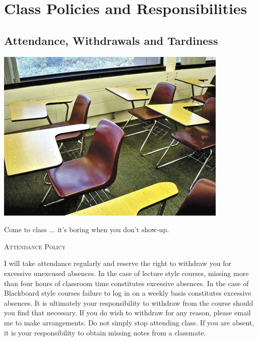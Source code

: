 \documentclass{tufte-handout}
\begin{document}
\section{Class Policies and Responsibilities}
\subsection {Attendance, Withdrawals and Tardiness}

\begin{marginfigure}%
  \includegraphics[width=\linewidth]{../assets/emptydesks.jpg}
  \caption{Come to class $\ldots$ it's boring when you don't show-up.}
  \label{fig:marginfig}
  \vspace{0.3in}
\end{marginfigure}

\begin{center}
\textsc{Attendance Policy}
\end{center}

I will take attendance regularly and reserve the right to withdraw you for excessive unexcused absences. In the case of lecture style courses, missing more than four hours of classroom time constitutes excessive absences. In the case of Blackboard style courses failure to log in on a weekly basis constitutes excessive absences. It is ultimately your responsibility to withdraw from the course should you find that necessary. If you do wish to withdraw for any reason, please email me to make arrangements. Do not simply stop attending class. If you are absent, it is your responsibility to obtain missing notes from a classmate.
\end{document}
